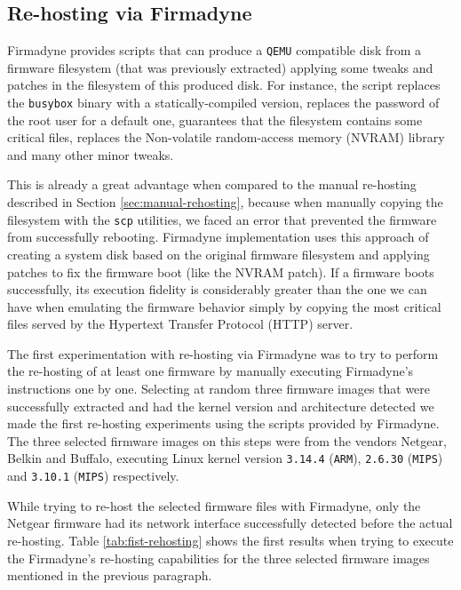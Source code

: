 \subsection{Re-hosting via Firmadyne}

Firmadyne provides scripts that can produce a {\tt QEMU} compatible disk from a firmware filesystem (that was previously extracted) applying some tweaks and patches in the filesystem of this produced disk. For instance, the script replaces the {\tt busybox} binary with a statically-compiled version, replaces the password of the root user for a default one, guarantees that the filesystem contains some critical files, replaces the Non-volatile random-access memory (NVRAM) library and many other minor tweaks.

This is already a great advantage when compared to the manual re-hosting described in Section \ref{sec:manual-rehosting}, because when manually copying the filesystem with the {\tt scp} utilities, we faced an error that prevented the firmware from successfully rebooting. Firmadyne implementation uses this approach of creating a system disk based on the original firmware filesystem and applying patches to fix the firmware boot (like the NVRAM patch). If a firmware boots successfully, its execution fidelity is considerably greater than the one we can have when emulating the firmware behavior simply by copying the most critical files served by the Hypertext Transfer Protocol (HTTP) server.


The first experimentation with re-hosting via Firmadyne was to try to perform the re-hosting of at least one firmware by manually executing Firmadyne's instructions one by one. Selecting at random three firmware images that were successfully extracted and had the kernel version and architecture detected we made the first re-hosting experiments using the scripts provided by Firmadyne. The three selected firmware images on this steps were from the vendors Netgear, Belkin and Buffalo, executing Linux kernel version {\tt 3.14.4} ({\tt ARM}), {\tt 2.6.30} ({\tt MIPS}) and {\tt 3.10.1} ({\tt MIPS}) respectively.

While trying to re-host the selected firmware files with Firmadyne, only the Netgear firmware had its network interface successfully detected before the actual re-hosting. Table \ref{tab:fist-rehosting} shows the first results when trying to execute the Firmadyne's re-hosting capabilities for the three selected firmware images mentioned in the previous paragraph.

